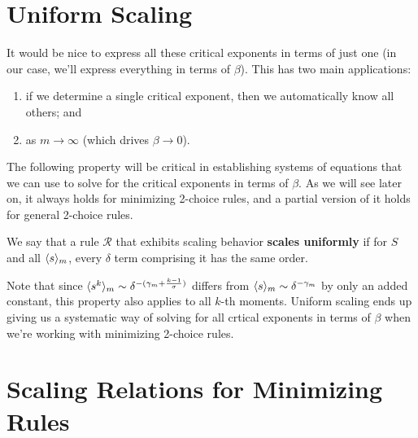 \documentclass[twoside,10pt]{article}
\begin{document}
\section{Uniform Scaling}

It would be nice to express all these critical exponents in terms of just one (in our case, we'll express everything in terms of $\beta$). This has two main applications:
\begin{enumerate}
	\item if we determine a single critical exponent, then we automatically know all others; and
	\item {} as $m\to \infty$ (which drives $\beta\to 0$).
\end{enumerate}
The following property will be critical in establishing systems of equations that we can use to solve for the critical exponents in terms of $\beta$. As we will see later on, it always holds for minimizing 2-choice rules, and a partial version of it holds for general 2-choice rules.

\begin{defn}[]
	We say that a rule $\mathcal{R}$ that exhibits scaling behavior \textbf{scales uniformly} if for $S$ and all $\langle s \rangle_{m}$, every $\delta$ term comprising it has the same order. 
\end{defn}

Note that since $\langle s^{k} \rangle_{m} \sim \delta^{-(\gamma_{m} + \frac{k-1}{\sigma})}$ differs from $\langle s \rangle_{m} \sim \delta^{-\gamma_{m}}$ by only an added constant, this property also applies to all $k$-th moments. Uniform scaling ends up giving us a systematic way of solving for all crtical exponents in terms of $\beta$ when we're working with minimizing 2-choice rules.

\section{Scaling Relations for Minimizing Rules}
\end{document}
